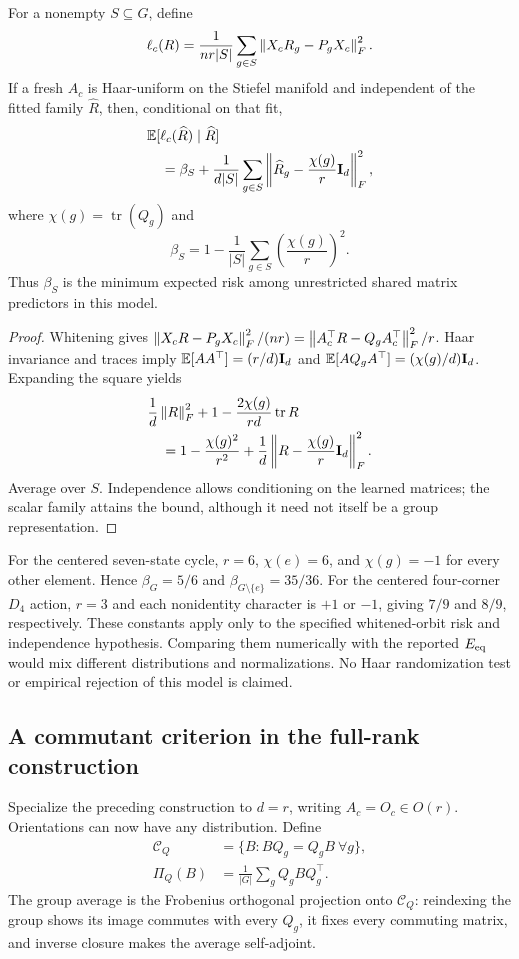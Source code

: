 \begin{proposition}
\label{prop:orientation}
For a nonempty $S\subseteq G$, define
\[
 \ell_c(R)=\frac{1}{nr|S|}\sum_{g\in S}\left\lVert X_cR_g-P_gX_c\right\rVert_F^2.
\]
If a fresh $A_c$ is Haar-uniform on the Stiefel manifold and independent of the fitted family $\widehat R$, then, conditional on that fit,
\begin{equation}
\begin{aligned}
 &\mathbb E[\ell_c(\widehat R)\mid\widehat R]\\
 &\quad=\beta_S+\frac{1}{d|S|}\sum_{g\in S}
 \left\lVert \widehat R_g-\frac{\chi(g)}r\mathbf{I}_d\right\rVert_F^2,
\end{aligned}
\end{equation}
where $\chi(g)=\operatorname{tr}(Q_g)$ and
\[
 \beta_S=1-\frac1{|S|}\sum_{g\in S}\left(\frac{\chi(g)}r\right)^2.
\]
Thus $\beta_S$ is the minimum expected risk among unrestricted shared matrix predictors in this model.
\end{proposition}
\begin{proof}
Whitening gives $\left\lVert X_cR-P_gX_c\right\rVert_F^2/(nr)=\left\lVert A_c^\top R-Q_gA_c^\top\right\rVert_F^2/r$. Haar invariance and traces imply $\mathbb E[AA^\top]=(r/d)\mathbf{I}_d$ and $\mathbb E[AQ_gA^\top]=(\chi(g)/d)\mathbf{I}_d$. Expanding the square yields
\begin{align*}
 &\frac1d\left\lVert R\right\rVert_F^2+1-\frac{2\chi(g)}{rd}\operatorname{tr}R\\
 &\quad=1-\frac{\chi(g)^2}{r^2}
   +\frac1d\left\lVert R-\frac{\chi(g)}r\mathbf{I}_d\right\rVert_F^2.
\end{align*}
Average over $S$. Independence allows conditioning on the learned matrices; the scalar family attains the bound, although it need not itself be a group representation.
\end{proof}
For the centered seven-state cycle, $r=6$, $\chi(e)=6$, and $\chi(g)=-1$ for every other element. Hence $\beta_G=5/6$ and $\beta_{G\setminus\{e\}}=35/36$. For the centered four-corner $D_4$ action, $r=3$ and each nonidentity character is $+1$ or $-1$, giving $7/9$ and $8/9$, respectively. These constants apply only to the specified whitened-orbit risk and independence hypothesis. Comparing them numerically with the reported $E_{\mathrm{eq}}$ would mix different distributions and normalizations. No Haar randomization test or empirical rejection of this model is claimed.

\subsection{A commutant criterion in the full-rank construction}
\label{app:commutant}
Specialize the preceding construction to $d=r$, writing $A_c=O_c\in O(r)$. Orientations can now have any distribution. Define
\begin{align*}
 \mathcal C_Q&=\{B:BQ_g=Q_gB\ \forall g\},\\
 \Pi_Q(B)&=\frac1{|G|}\sum_g Q_gBQ_g^\top.
\end{align*}
The group average is the Frobenius orthogonal projection onto $\mathcal C_Q$: reindexing the group shows its image commutes with every $Q_g$, it fixes every commuting matrix, and inverse closure makes the average self-adjoint.


